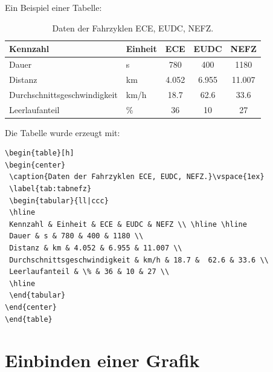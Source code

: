 Ein Beispiel einer Tabelle:
\begin{table}[h]
\begin{center}
 \caption{Daten der Fahrzyklen ECE, EUDC, NEFZ.}\vspace{1ex}
 \label{tab:tabnefz}
 \begin{tabular}{ll|ccc}
 \hline
 Kennzahl & Einheit & ECE & EUDC & NEFZ \\ \hline \hline
 Dauer & s & 780 & 400 & 1180 \\
 Distanz & km & 4.052 & 6.955 & 11.007 \\
 Durchschnittsgeschwindigkeit & km/h & 18.7 &  62.6 & 33.6 \\
 Leerlaufanteil & \% & 36 & 10 & 27 \\
 \hline
 \end{tabular}
\end{center}
\end{table}

Die Tabelle wurde erzeugt mit:
\begin{verbatim}
\begin{table}[h]
\begin{center}
 \caption{Daten der Fahrzyklen ECE, EUDC, NEFZ.}\vspace{1ex}
 \label{tab:tabnefz}
 \begin{tabular}{ll|ccc}
 \hline
 Kennzahl & Einheit & ECE & EUDC & NEFZ \\ \hline \hline
 Dauer & s & 780 & 400 & 1180 \\
 Distanz & km & 4.052 & 6.955 & 11.007 \\
 Durchschnittsgeschwindigkeit & km/h & 18.7 &  62.6 & 33.6 \\
 Leerlaufanteil & \% & 36 & 10 & 27 \\
 \hline
 \end{tabular}
\end{center}
\end{table}
\end{verbatim}


\section{Einbinden einer Grafik}\label{sec:epsgraph}

